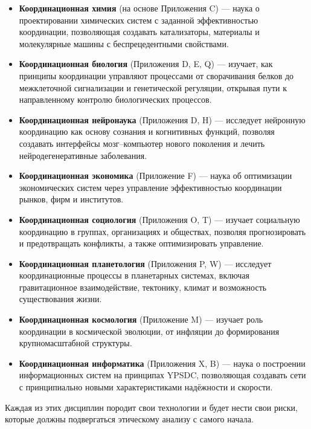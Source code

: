 \documentclass[12pt,a4paper]{article}
\theoremstyle{remark}
\begin{document}
	\begin{itemize}[leftmargin=*]
		\item \textbf{Координационная химия} (на основе Приложения C) — наука о проектировании химических систем с заданной эффективностью координации, позволяющая создавать катализаторы, материалы и молекулярные машины с беспрецедентными свойствами.
		
		\item \textbf{Координационная биология} (Приложения D, E, Q) — изучает, как принципы координации управляют процессами от сворачивания белков до межклеточной сигнализации и генетической регуляции, открывая пути к направленному контролю биологических процессов.
		
		\item \textbf{Координационная нейронаука} (Приложения D, H) — исследует нейронную координацию как основу сознания и когнитивных функций, позволяя создавать интерфейсы мозг–компьютер нового поколения и лечить нейродегенеративные заболевания.
		
		\item \textbf{Координационная экономика} (Приложение F) — наука об оптимизации экономических систем через управление эффективностью координации рынков, фирм и институтов.
		
		\item \textbf{Координационная социология} (Приложения O, T) — изучает социальную координацию в группах, организациях и обществах, позволяя прогнозировать и предотвращать конфликты, а также оптимизировать управление.
		
		\item \textbf{Координационная планетология} (Приложения P, W) — исследует координационные процессы в планетарных системах, включая гравитационное взаимодействие, тектонику, климат и возможность существования жизни.
		
		\item \textbf{Координационная космология} (Приложение M) — изучает роль координации в космической эволюции, от инфляции до формирования крупномасштабной структуры.
		
		\item \textbf{Координационная информатика} (Приложения X, B) — наука о построении информационных систем на принципах YPSDC, позволяющая создавать сети с принципиально новыми характеристиками надёжности и скорости.
	\end{itemize}
	
	Каждая из этих дисциплин породит свои технологии и будет нести свои риски, которые должны подвергаться этическому анализу с самого начала.
	
\end{document}
